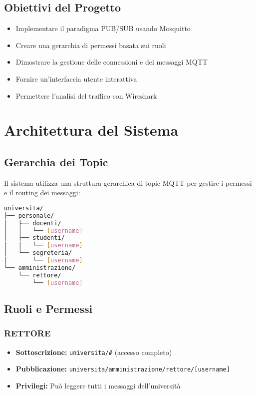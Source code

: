 \documentclass[12pt,a4paper]{article}
\begin{document}
\subsection{Obiettivi del Progetto}

\begin{itemize}
    \item Implementare il paradigma PUB/SUB usando Mosquitto
    \item Creare una gerarchia di permessi basata sui ruoli
    \item Dimostrare la gestione delle connessioni e dei messaggi MQTT
    \item Fornire un'interfaccia utente interattiva
    \item Permettere l'analisi del traffico con Wireshark
\end{itemize}

\section{Architettura del Sistema}

\subsection{Gerarchia dei Topic}

Il sistema utilizza una struttura gerarchica di topic MQTT per gestire i permessi e il routing dei messaggi:

\begin{lstlisting}[language=bash, caption=Struttura Topic MQTT]
universita/
├── personale/
│   ├── docenti/
│   │   └── [username]
│   ├── studenti/
│   │   └── [username]
│   └── segreteria/
│       └── [username]
└── amministrazione/
    └── rettore/
        └── [username]
\end{lstlisting}

\subsection{Ruoli e Permessi}

\subsubsection{RETTORE}
\begin{itemize}
    \item \textbf{Sottoscrizione:} \texttt{universita/\#} (accesso completo)
    \item \textbf{Pubblicazione:} \texttt{universita/amministrazione/rettore/[username]}
    \item \textbf{Privilegi:} Può leggere tutti i messaggi dell'università
\end{itemize}
\end{document}
